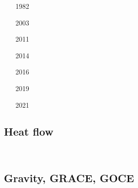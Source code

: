 \begin{scriptsize}
\begin{itemize}
\item[1982]
\textcite{tapl82} 
\item[2003]
\textcite{hukm03} 
\item[2011]
\textcite{seep11} 
\item[2014]
\textcite{capi14} 
\item[2016]
\textcite{capi16} 
\item[2019]
\textcite{sccs19} 
\item[2021]
\textcite{cull21} 
\end{itemize}
\end{scriptsize}



\subsection{Heat flow}
\begin{scriptsize}
\begin{itemize}
\item[\nineteensixtyseven] 
\textcite{mcke67} \\
\item[\twothousandten] 
\textcite{dada10} 
\item[\twothousandtwenty]
\textcite{moku20} 
\end{itemize}
\end{scriptsize}

\subsection{Gravity, GRACE, GOCE}

